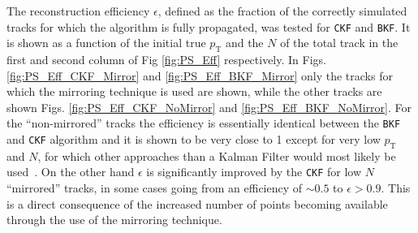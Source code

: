 The reconstruction efficiency $\epsilon$, defined as the fraction of the correctly simulated tracks for which the algorithm is fully propagated, was tested for \texttt{CKF} and \texttt{BKF}. It is shown as a function of the initial true $p_\textrm{T}$ and the $N$ of the total track in the first and second column of Fig \ref{fig:PS_Eff} respectively. In Figs. \ref{fig:PS_Eff_CKF_Mirror} and \ref{fig:PS_Eff_BKF_Mirror} only the tracks for which the mirroring technique is used are shown, while the other tracks are shown Figs. \ref{fig:PS_Eff_CKF_NoMirror} and \ref{fig:PS_Eff_BKF_NoMirror}. For the ``non-mirrored'' tracks the efficiency is essentially identical between the \texttt{BKF} and \texttt{CKF} algorithm and it is shown to be very close to 1 except for very low $p_\textrm{T}$ and $N$, for which other approaches  than a Kalman Filter would most likely be used~\cite{RevModPhys.82.1419}. On the other hand $\epsilon$ is significantly improved by the \texttt{CKF} for low $N$ ``mirrored'' tracks, in some cases going from an efficiency of $\sim0.5$ to $\epsilon>0.9$. This is a direct consequence of the increased number of points becoming available through the use of the mirroring technique.   

